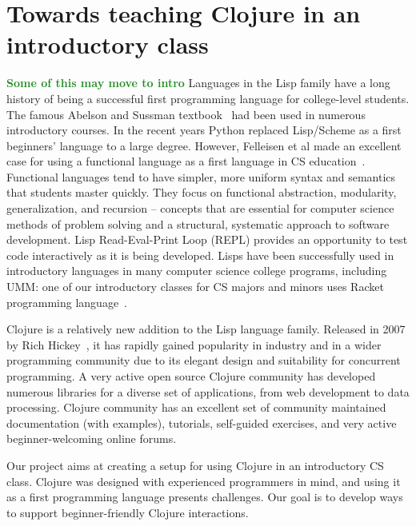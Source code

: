 \documentclass[submission,copyright,creativecommons]{eptcs}
\newcommand{\allcomments}[1]{{#1}}
\newcommand{\emcomment}[1]{{\bf \textcolor{ForestGreen}{\allcomments{{#1}}}}}
\begin{document}
\section{Towards teaching Clojure in an introductory class}\label{sec:project}
\emcomment{Some of this may move to intro}
Languages in the Lisp family have a long history of being a successful first programming language for college-level students.
The famous Abelson and Sussman textbook~\cite{Abelson} had been used in numerous introductory courses.
In the recent years Python replaced Lisp/Scheme as a first beginners' language to a large degree. However, 
Felleisen et al made an excellent case for using a functional language as a first language in  CS education~\cite{Felleisen:2004}.   
Functional languages tend to have simpler, more uniform syntax and semantics that students master quickly.
They focus on functional abstraction, modularity, generalization, and recursion -- concepts that are essential for computer science methods of 
problem solving and a structural, systematic approach to software development. 
Lisp Read-Eval-Print Loop (REPL) provides an opportunity to test code interactively as it is being developed. 
Lisps have been successfully used in introductory languages in many computer science college programs, including UMM: 
one of our introductory classes for CS majors and minors uses Racket programming language~\cite{htdp,htdp2}. 

Clojure is a relatively new addition to the Lisp language family. Released in 2007 by Rich Hickey~\cite{Hickey:2008}, it has rapidly gained popularity in industry
and in a wider programming community 
due to its elegant design and suitability for concurrent programming. A very active open source Clojure community has developed numerous 
libraries for a diverse set of applications, from web development to data processing. 
Clojure community has an excellent set of community maintained documentation (with examples), tutorials, 
self-guided exercises, and very active beginner-welcoming online forums.

Our project aims at creating a setup for using Clojure in an introductory CS class. Clojure was designed with experienced programmers in mind, 
and using it as a first programming language presents challenges. Our goal is to develop ways to support beginner-friendly Clojure interactions. 
\end{document}
